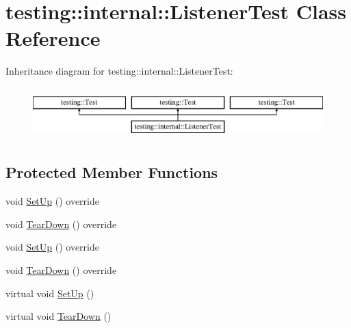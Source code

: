 \hypertarget{classtesting_1_1internal_1_1_listener_test}{}\section{testing\+::internal\+::Listener\+Test Class Reference}
\label{classtesting_1_1internal_1_1_listener_test}
Inheritance diagram for testing\+::internal\+::Listener\+Test\+:\begin{figure}[H]
\begin{center}
\leavevmode
\includegraphics[height=2.000000cm]{d9/d10/classtesting_1_1internal_1_1_listener_test}
\end{center}
\end{figure}
\subsection*{Protected Member Functions}
\begin{DoxyCompactItemize}
\item 
void \mbox{\hyperlink{classtesting_1_1internal_1_1_listener_test_a84f28c5bd517cdc07ec7b3d612fa6e30}{Set\+Up}} () override
\item 
void \mbox{\hyperlink{classtesting_1_1internal_1_1_listener_test_a733f61300772e432a6a3ec7837c9f331}{Tear\+Down}} () override
\item 
void \mbox{\hyperlink{classtesting_1_1internal_1_1_listener_test_a84f28c5bd517cdc07ec7b3d612fa6e30}{Set\+Up}} () override
\item 
void \mbox{\hyperlink{classtesting_1_1internal_1_1_listener_test_a733f61300772e432a6a3ec7837c9f331}{Tear\+Down}} () override
\item 
virtual void \mbox{\hyperlink{classtesting_1_1internal_1_1_listener_test_ace3dbe36b705ddf320518e6cdd919bc8}{Set\+Up}} ()
\item 
virtual void \mbox{\hyperlink{classtesting_1_1internal_1_1_listener_test_ad112535025d668e3ea14e71d8741c810}{Tear\+Down}} ()
\end{DoxyCompactItemize}
